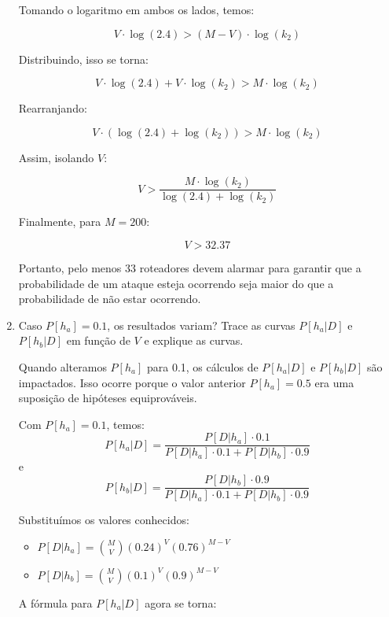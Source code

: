 \documentclass[12 pt]{article}
\begin{document}
\begin{enumerate}
\begin{tcolorbox}[colback=white, colframe=black, title=Resposta:]
    Tomando o logaritmo em ambos os lados, temos:
    
    $$
    V \cdot \log(2.4) > (M - V) \cdot \log(k_2)
    $$
    
    Distribuindo, isso se torna:
    
    $$
    V \cdot \log(2.4) + V \cdot \log(k_2) > M \cdot \log(k_2) 
    $$
    
    Rearranjando:
    
    $$
    V \cdot (\log(2.4) + \log(k_2)) > M \cdot \log(k_2)
    $$
    
    Assim, isolando \( V \):
    
    $$
    V > \frac{M \cdot \log(k_2)}{\log(2.4) + \log(k_2)}
    $$
    
    Finalmente, para \( M = 200 \):
    
    $$
    V > 32.37
    $$
    
    Portanto, pelo menos \( 33 \) roteadores devem alarmar para garantir que a probabilidade de um ataque esteja ocorrendo seja maior do que a probabilidade de não estar ocorrendo.
    
\end{tcolorbox}

    \item Caso $P[h_a] = 0.1$, os resultados variam? Trace as curvas $P[h_a|D]$ e $P[h_b|D]$ em função de $V$ e explique as curvas.
    
    \begin{tcolorbox}[colback=white, colframe=black, title=Resposta:]

Quando alteramos \( P[h_a] \) para 0.1, os cálculos de \( P[h_a|D] \) e \( P[h_b|D] \) são impactados. Isso ocorre porque o valor anterior \( P[h_a] = 0.5 \) era uma suposição de hipóteses equiprováveis.

Com \( P[h_a] = 0.1 \), temos:
$$
P[h_a|D] = \frac{P[D|h_a] \cdot 0.1}{P[D|h_a] \cdot 0.1 + P[D|h_b] \cdot 0.9}
$$
e
$$
P[h_b|D] = \frac{P[D|h_b] \cdot 0.9}{P[D|h_a] \cdot 0.1 + P[D|h_b] \cdot 0.9}
$$

Substituímos os valores conhecidos:

\begin{itemize}
    \item \( P[D|h_a] = \binom{M}{V} (0.24)^V (0.76)^{M - V} \)
    \item \( P[D|h_b] = \binom{M}{V} (0.1)^V (0.9)^{M - V} \)
\end{itemize}

A fórmula para \( P[h_a|D] \) agora se torna:


\end{tcolorbox}
\end{enumerate}
\end{document}
